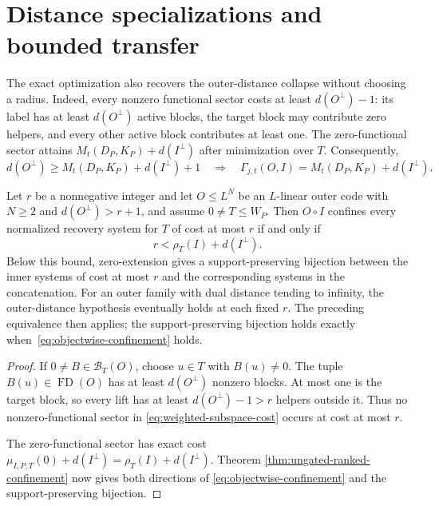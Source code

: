 \section{Distance specializations and bounded transfer}
\label{sec:outer-distance-collapse}

The exact optimization also recovers the outer-distance collapse without
choosing a radius.  Indeed, every nonzero functional sector costs at least
$d(O^\perp)-1$: its label has at least $d(O^\perp)$ active blocks, the target
block may contribute zero helpers, and every other active block contributes
at least one.  The zero-functional sector attains
$M_t(D_P,K_P)+d(I^\perp)$ after minimization over $T$.  Consequently,
\begin{equation}
 d(O^\perp)\geq M_t(D_P,K_P)+d(I^\perp)+1
 \quad\Longrightarrow\quad
 \Gamma_{j,t}(O,I)=M_t(D_P,K_P)+d(I^\perp).
 \label{eq:ranked-weighted-collapse}
\end{equation}

\begin{theorem}
\label{thm:objectwise-confinement}
%
Let $r$ be a nonnegative integer and let $O\leq L^N$ be an $L$-linear outer
code with $N\geq2$ and $d(O^\perp)>r+1$, and assume $0\ne T\leq W_P$.  Then
$O\circ I$ confines every
normalized recovery system for $T$ of cost at most $r$ if and only if
\begin{equation}
 r<\rho_T(I)+d(I^\perp).
 \label{eq:objectwise-confinement}
\end{equation}
Below this bound, zero-extension gives a support-preserving bijection between
the inner systems of cost at most $r$ and the corresponding systems in the
concatenation.  For an outer family with dual distance tending to infinity,
the outer-distance hypothesis eventually holds at each fixed $r$.  The
preceding equivalence then applies; the support-preserving bijection holds
exactly when~\eqref{eq:objectwise-confinement} holds.
\end{theorem}

\begin{proof}
If $0\ne B\in\mathcal B_T(O)$, choose $u\in T$ with $B(u)\ne0$.  The tuple
$B(u)\in\operatorname{FD}(O)$ has at least $d(O^\perp)$ nonzero blocks.
At most one is the target block, so every lift has at least
$d(O^\perp)-1>r$ helpers outside it.  Thus no nonzero-functional sector in
\eqref{eq:weighted-subspace-cost} occurs at cost at most $r$.

The zero-functional sector has exact cost
$\mu_{I,P,T}(0)+d(I^\perp)=\rho_T(I)+d(I^\perp)$.  Theorem
\ref{thm:ungated-ranked-confinement} now gives both directions of
\eqref{eq:objectwise-confinement} and the support-preserving bijection.
%
%
\end{proof}

